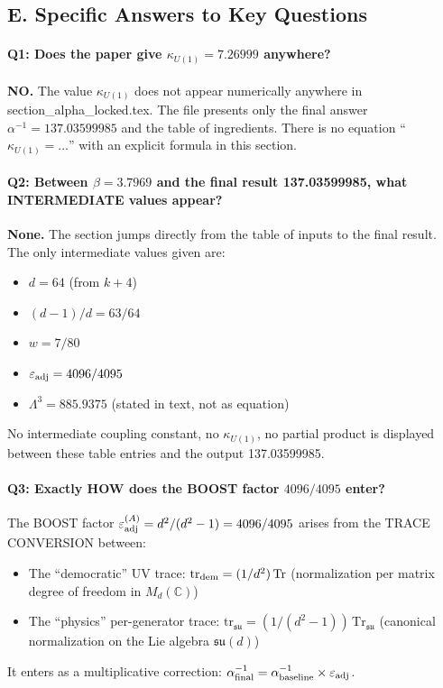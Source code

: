 \subsection*{E. Specific Answers to Key Questions}

\paragraph{Q1: Does the paper give $\kappa_{U(1)} = 7.26999$ anywhere?}

\textbf{NO.} The value $\kappa_{U(1)}$ does not appear numerically anywhere
in section\_alpha\_locked.tex. The file presents only the final answer
$\alpha^{-1} = 137.03599985$ and the table of ingredients.
There is no equation ``$\kappa_{U(1)} = \ldots$'' with an explicit formula
in this section.

\paragraph{Q2: Between $\beta = 3.7969$ and the final result 137.03599985,
what INTERMEDIATE values appear?}

\textbf{None.} The section jumps directly from the table of inputs to the
final result. The only intermediate values given are:
\begin{itemize}
  \item $d = 64$ (from $k + 4$)
  \item $(d-1)/d = 63/64$
  \item $w = 7/80$
  \item $\varepsilon_{\rm adj} = 4096/4095$
  \item $\Lambda^3 = 885.9375$ (stated in text, not as equation)
\end{itemize}
No intermediate coupling constant, no $\kappa_{U(1)}$, no partial product
is displayed between these table entries and the output 137.03599985.

\paragraph{Q3: Exactly HOW does the BOOST factor $4096/4095$ enter?}

The BOOST factor $\varepsilon_{\rm adj}^{(A)} = d^2/(d^2-1) = 4096/4095$
arises from the TRACE CONVERSION between:
\begin{itemize}
  \item The ``democratic'' UV trace: $\mathrm{tr}_{\rm dem} = (1/d^2)\,\mathrm{Tr}$
        (normalization per matrix degree of freedom in $M_d(\mathbb{C})$)
  \item The ``physics'' per-generator trace: $\mathrm{tr}_{\mathfrak{su}} =
        (1/(d^2-1))\,\mathrm{Tr}_{\mathfrak{su}}$ (canonical normalization
        on the Lie algebra $\mathfrak{su}(d)$)
\end{itemize}
It enters as a multiplicative correction: $\alpha^{-1}_{\rm final} =
\alpha^{-1}_{\rm baseline} \times \varepsilon_{\rm adj}$.

